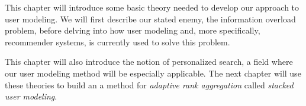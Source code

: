 \label{chap:theory}

This chapter will introduce some basic theory needed to develop our approach to user modeling.
We will first describe our stated enemy, the information overload problem, before delving into
how user modeling and, more specifically, recommender systems, is currently used to solve this problem.

This chapter will also introduce the notion of personalized search, a field where
our user modeling method will be especially applicable.
The next chapter will use these theories to build an 
a method for \emph{adaptive rank aggregation}
called \emph{stacked user modeling}.


